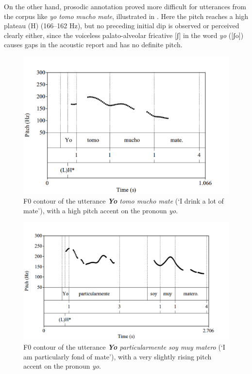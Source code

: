 \documentclass[output=paper]{langsci/langscibook}
\begin{document}
On the other hand, prosodic annotation proved more difficult for utterances from the corpus like \textit{yo tomo mucho mate}, illustrated in . Here the pitch reaches a high plateau (H) (166–162 Hz), but no preceding initial dip is observed or perceived clearly either, since the voiceless palato-alveolar fricative [ʃ] in the word \textit{yo} ([ʃo]) causes gaps in the acoustic report and has no definite pitch.

  

\begin{figure}[p]
\includegraphics[width=\textwidth]{figures/pes-img5.png}
\caption{F0 contour of the utterance \textit{\textbf{Yo} tomo mucho mate} (‘I drink a lot of mate’), with a high pitch accent on the pronoun \textit{yo}.\label{fig:pes:5}}
  \end{figure}
  
  \begin{figure}[p]
\includegraphics[width=\textwidth]{figures/pes-img6.png}
\caption{F0 contour of the utterance \textit{\textbf{Yo} particularmente soy muy matero} (‘I am particularly fond of {mate}’), with a very slightly rising pitch accent on the pronoun \textit{yo}.\label{fig:pes:6}}
\end{figure}
  
\end{document}
